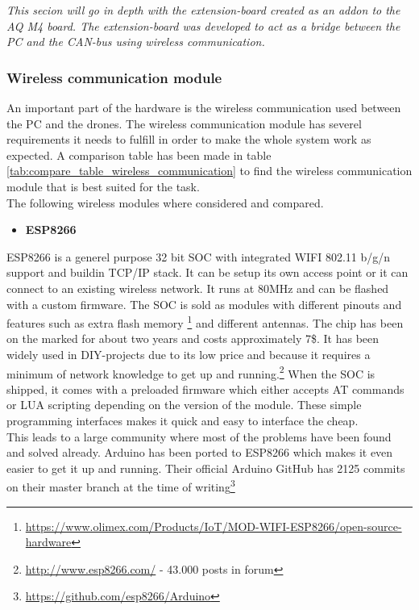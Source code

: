 \textit{This secion will go in depth with the extension-board created as an addon to the AQ M4 board. The extension-board was developed to act as a bridge between the PC and the CAN-bus using wireless communication.} \\

\subsubsection{Wireless communication module}
An important part of the hardware is the wireless communication used between the PC and the drones.
The wireless communication module has severel requirements it needs to fulfill in order to make the whole system work as expected. A comparison table has been made in table \ref{tab:compare_table_wireless_communication} to find the wireless communication module that is best suited for the task. \\
The following wireless modules where considered and compared.
\begin{itemize}
	\item \textbf{ESP8266}
\end{itemize}

ESP8266 is a generel purpose 32 bit SOC with integrated WIFI 802.11 b/g/n support and buildin TCP/IP stack. It can be setup its own access point or it can connect to an existing wireless network.
It runs at 80MHz and can be flashed with a custom firmware. 
The SOC is sold as modules with different pinouts and features such as extra flash memory \footnote{\url{https://www.olimex.com/Products/IoT/MOD-WIFI-ESP8266/open-source-hardware}} and different antennas.
The chip has been on the marked for about two years and costs approximately 7\$. 
It has been widely used in DIY-projects due to its low price and because it requires a minimum of network knowledge to get up and running.\footnote{\url{http://www.esp8266.com/} - 43.000 posts in forum} When the SOC is shipped, it comes with a preloaded firmware which either accepts AT commands or LUA scripting depending on the version of the module. These simple programming interfaces makes it quick and easy to interface the cheap. \\
This leads to a large community where most of the problems have been found and solved already. Arduino has been ported to ESP8266 which makes it even easier to get it up and running. Their official Arduino GitHub has 2125 commits on their master branch at the time of writing\footnote{\url{https://github.com/esp8266/Arduino}} \\

